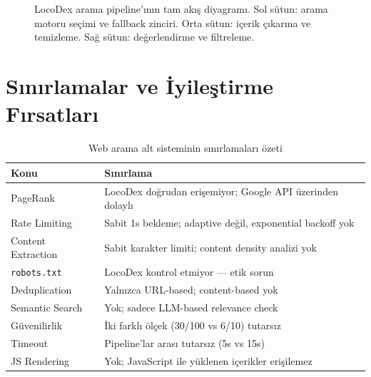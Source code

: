 \begin{figure}[H]
\caption{LocoDex arama pipeline'{\i}n{\i}n tam ak{\i}\c{s} diyagram{\i}. Sol s\"{u}tun: arama motoru se\c{c}imi ve fallback zinciri. Orta s\"{u}tun: i\c{c}erik \c{c}{\i}karma ve temizleme. Sa\u{g} s\"{u}tun: de\u{g}erlendirme ve filtreleme.}
\label{fig:full-pipeline}
\end{figure}


\section{S{\i}n{\i}rlamalar ve \.{I}yile\c{s}tirme F{\i}rsatlar{\i}}
\label{sec:arama-sinirlamalar}

\begin{table}[H]
\centering
\caption{Web arama alt sisteminin s{\i}n{\i}rlamalar{\i} \"{o}zeti}
\label{tab:limitations}
\begin{tabularx}{\textwidth}{lX}
\toprule
\color{chapterBlue}\textbf{Konu} & \color{chapterBlue}\textbf{S{\i}n{\i}rlama} \\
\midrule
PageRank & LocoDex do\u{g}rudan eri\c{s}emiyor; Google API \"{u}zerinden dolayl{\i} \\
Rate Limiting & Sabit 1s bekleme; adaptive de\u{g}il, exponential backoff yok \\
Content Extraction & Sabit karakter limiti; content density analizi yok \\
\texttt{robots.txt} & LocoDex kontrol etmiyor --- etik sorun \\
Deduplication & Yaln{\i}zca URL-based; content-based yok \\
Semantic Search & Yok; sadece LLM-based relevance check \\
G\"{u}venilirlik & \.{I}ki farkl{\i} \"{o}l\c{c}ek (30/100 vs 6/10) tutars{\i}z \\
Timeout & Pipeline'lar aras{\i} tutars{\i}z (5s vs 15s) \\
JS Rendering & Yok; JavaScript ile y\"{u}klenen i\c{c}erikler eri\c{s}ilemez \\
\bottomrule
\end{tabularx}
\end{table}


